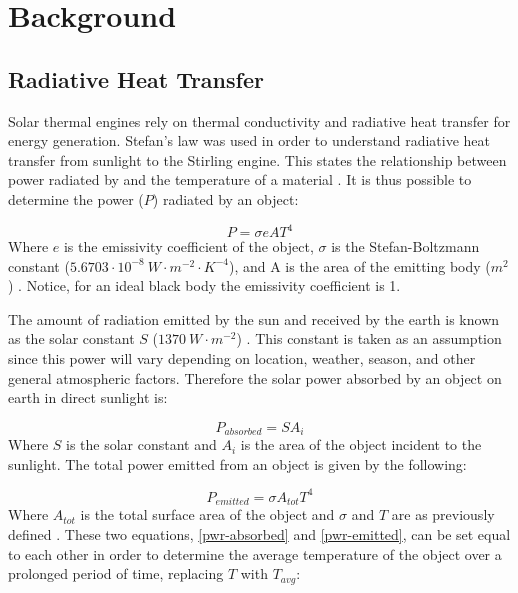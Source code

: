 \chapter{Background}

\section{Radiative Heat Transfer}

    Solar thermal engines rely on thermal conductivity and radiative heat transfer for energy generation. Stefan's law was used in order to understand radiative heat transfer from sunlight to the Stirling engine. This states the relationship between power radiated by and the temperature of a material \cite{thermal}. It is thus possible to determine the power ($P$) radiated by an object:
    
    \begin{equation}
        P = \sigma eA T^{4}
        \label{stefan}
    \end{equation}
    Where $e$ is the emissivity coefficient of the object, $\sigma$ is the Stefan-Boltzmann constant ($5.6703 \cdot 10^{-8} \ W \cdot m^{-2} \cdot K^{-4}$), and A is the area of the emitting body ($m^{2}$) \cite{thermal}. Notice, for an ideal black body the emissivity coefficient is 1.
    
    The amount of radiation emitted by the sun and received by the earth is known as the solar constant $S$ ($1370 \ W \cdot m^{-2}$) \cite{thermal}. This constant is taken as an assumption since this power will vary depending on location, weather, season, and other general atmospheric factors. Therefore the solar power absorbed by an object on earth in direct sunlight is:
    
    \begin{equation}
        P_{absorbed} = SA_{i}
        \label{pwr-absorbed}
    \end{equation}
    Where $S$ is the solar constant and $A_{i}$ is the area of the object incident to the sunlight. The total power emitted from an object is given by the following:
    
    \begin{equation}
        P_{emitted} = \sigma A_{tot}T^{4}
        \label{pwr-emitted}
    \end{equation}
    Where $A_{tot}$ is the total surface area of the object and $\sigma$ and $T$ are as previously defined \cite{thermal}. These two equations, \ref{pwr-absorbed} and \ref{pwr-emitted}, can be set equal to each other in order to determine the average temperature of the object over a prolonged period of time, replacing $T$ with $T_{avg}$:
    
